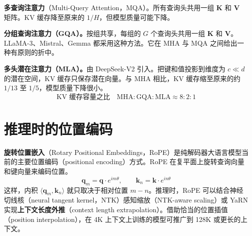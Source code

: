 \textbf{多查询注意力}（Multi-Query Attention，MQA）。所有查询头共用一组 $\mathbf{K}$ 和 $\mathbf{V}$ 矩阵。KV 缓存降至原来的 $1/H$，但模型质量可能下降。

\textbf{分组查询注意力（GQA）。}按组共享，每组的 $G$ 个查询头共用一组 $\mathbf{K}$ 和 $\mathbf{V}$。LLaMA-3、Mistral、Gemma 都采用这种方法。它在 MHA 与 MQA 之间给出一种有原则的折中。

\textbf{多头潜在注意力（MLA）。}由 DeepSeek-V2 引入。把键和值投影到维度为 $c\ll d$ 的潜在空间，KV 缓存只保存潜在向量。与 MHA 相比，KV 缓存缩至原来的约 $1/13$ 至 $1/5$，模型质量下降很小。
\[
\text{KV 缓存容量之比}\quad \mathrm{MHA}:\mathrm{GQA}:\mathrm{MLA}\approx 8:2:1
\]

\section{推理时的位置编码}

\textbf{旋转位置嵌入}（Rotary Positional Embeddings，RoPE）是纯解码器大语言模型当前的主要位置编码（positional encoding）方式。RoPE 在复平面上旋转查询向量和键向量来编码位置。
\[
\mathbf{q}_m=\mathbf{q}\cdot e^{im\theta},
\qquad
\mathbf{k}_n=\mathbf{k}\cdot e^{in\theta}
\]
这样，内积 $\langle\mathbf{q}_m,\mathbf{k}_n\rangle$ 就只取决于相对位置 $m-n$。推理时，RoPE 可以结合神经切线核（neural tangent kernel，NTK）感知缩放（NTK-aware scaling）或 YaRN 实现\textbf{上下文长度外推}（context length extrapolation）。借助恰当的位置插值（position interpolation），在 4K 上下文上训练的模型可推广到 128K 或更长的上下文。

